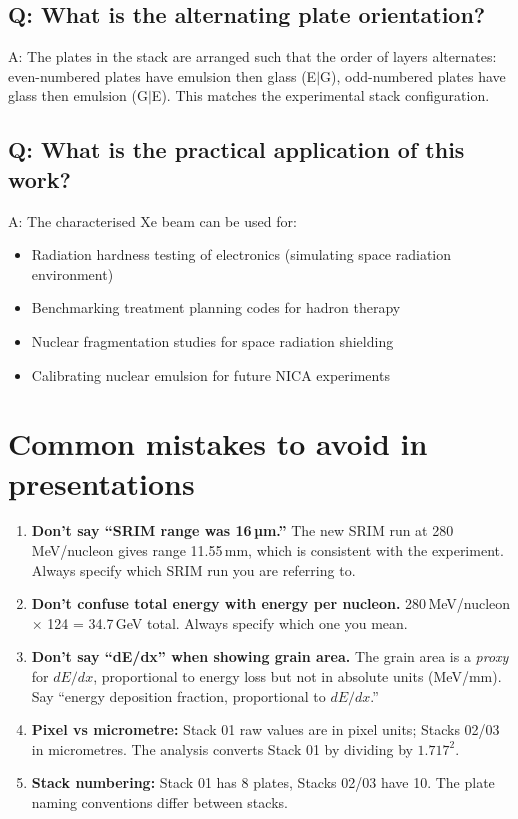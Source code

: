 \documentclass[12pt,a4paper]{article}
\begin{document}
\subsection*{Q: What is the alternating plate orientation?}
A: The plates in the stack are arranged such that the order of
layers alternates: even-numbered plates have emulsion then glass
(E$|$G), odd-numbered plates have glass then emulsion (G$|$E).
This matches the experimental stack configuration.

\subsection*{Q: What is the practical application of this work?}
A: The characterised Xe beam can be used for:
\begin{itemize}
  \item Radiation hardness testing of electronics (simulating space
        radiation environment)
  \item Benchmarking treatment planning codes for hadron therapy
  \item Nuclear fragmentation studies for space radiation shielding
  \item Calibrating nuclear emulsion for future NICA experiments
\end{itemize}

\section{Common mistakes to avoid in presentations}

\begin{enumerate}
  \item \textbf{Don't say ``SRIM range was 16\,µm.''} The new
        SRIM run at 280\,MeV/nucleon gives range 11.55\,mm, which is
        consistent with the experiment. Always specify which SRIM
        run you are referring to.
  \item \textbf{Don't confuse total energy with energy per nucleon.}
        280\,MeV/nucleon $\times$ 124 = 34.7\,GeV total. Always
        specify which one you mean.
  \item \textbf{Don't say ``dE/dx'' when showing grain area.} The
        grain area is a \emph{proxy} for $dE/dx$, proportional to
        energy loss but not in absolute units (MeV/mm). Say ``energy
        deposition fraction, proportional to $dE/dx$.''
  \item \textbf{Pixel vs micrometre:} Stack 01 raw values are in
        pixel units; Stacks 02/03 in micrometres. The analysis
        converts Stack 01 by dividing by $1.717^2$.
  \item \textbf{Stack numbering:} Stack 01 has 8 plates, Stacks 02/03
        have 10. The plate naming conventions differ between stacks.
\end{enumerate}
\end{document}
